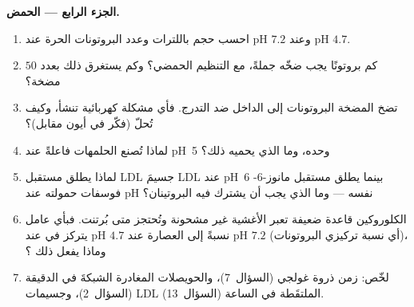 \begin{problem}
\medskip
\noindent\textbf{الجزء الرابع --- الحمض.}
\begin{enumerate}[resume]
  \item احسب حجم  باللترات وعدد البروتونات
        الحرة عند pH $7.2$ وعند pH $4.7$.
  \item كم بروتونًا يجب ضخّه جملةً، مع التنظيم الحمضي؟
        وكم يستغرق ذلك بعدد $50$ مضخة؟
  \item تضخ المضخة البروتونات إلى الداخل ضد التدرج. فأي
        مشكلة كهربائية تنشأ، وكيف تُحلّ (فكّر في
        أيون مقابل)؟
  \item لماذا تُصنع الحلمهات فاعلةً عند pH~5 وحده، وما الذي يحميه
        ذلك؟
  \item لماذا يطلق مستقبل LDL جسيمَ LDL عند pH~6 بينما يطلق
        مستقبل مانوز-6-فوسفات حمولته عند pH نفسه ---
        وما الذي يجب أن يشترك فيه البروتينان؟
  \item الكلوروكين قاعدة ضعيفة تعبر الأغشية غير مشحونة
        وتُحتجز متى بُرتنت. فبأي عامل يتركز
        في  عند pH $4.7$ نسبةً إلى العصارة عند
        pH $7.2$ (أي نسبة تركيزي البروتونات)، وماذا يفعل
        ذلك ؟
  \item لخّص: زمن ذروة غولجي (السؤال~7)، والحويصلات
        المغادرة الشبكةَ في الدقيقة (السؤال~2)، وجسيمات
        LDL الملتقَطة في الساعة (السؤال~13).
\end{enumerate}
\end{problem}
